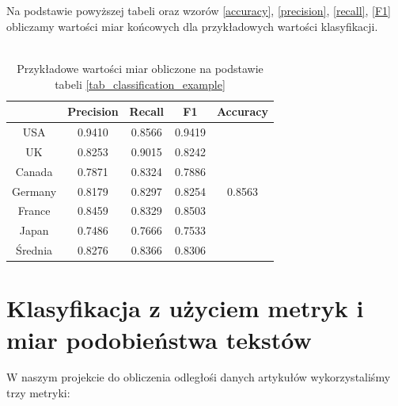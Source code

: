 \documentclass{classrep}
\begin{document}
\\\\
Na podstawie powyższej tabeli oraz wzorów \ref{accuracy}, \ref{precision}, \ref{recall}, \ref{F1} obliczamy wartości miar końcowych dla przykładowych wartości klasyfikacji.
\\\\
\begin{table}[H]\label{tab_quality_example}
\centering
\begin{tabular}{c|c|c|c|c|}
\cline{2-5}
 & Precision & Recall & F1 & Accuracy \\ \hline
\multicolumn{1}{|c|}{USA} & 0.9410 & 0.8566 & 0.9419 & \multirow{7}{*}{0.8563} \\ \cline{1-4}
\multicolumn{1}{|c|}{UK} & 0.8253 & 0.9015 & 0.8242 &  \\ \cline{1-4}
\multicolumn{1}{|c|}{Canada} & 0.7871 & 0.8324 & 0.7886 &  \\ \cline{1-4}
\multicolumn{1}{|c|}{Germany} & 0.8179 & 0.8297 & 0.8254 &  \\ \cline{1-4}
\multicolumn{1}{|c|}{France} & 0.8459 & 0.8329 & 0.8503 &  \\ \cline{1-4}
\multicolumn{1}{|c|}{Japan} & 0.7486 & 0.7666 & 0.7533 &  \\ \cline{1-4}
\multicolumn{1}{|c|}{Średnia} & 0.8276 & 0.8366 & 0.8306 &  \\ \cline{1-5} 
\end{tabular}
\caption{Przykładowe wartości miar obliczone na podstawie tabeli \ref{tab_classification_example}}
\end{table}

\section{Klasyfikacja z użyciem metryk i miar podobieństwa tekstów}


W naszym projekcie do obliczenia odległośi danych artykułów wykorzystaliśmy trzy metryki:

\def\engram_foot{W przypadku cech liczbowych jest to różnica ich wartości, w przypadku cech tekstowych obliczany jest 1-$sim_n$ (patrz wzór \ref{ngram})}
\end{document}
